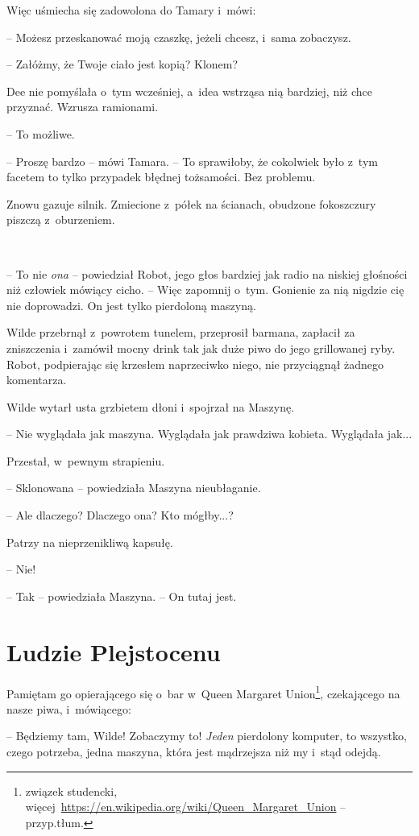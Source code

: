\documentclass[oneside,polish,11pt,sfheadings]{mwbk}
\begin{document}
Więc uśmiecha się zadowolona do Tamary i~mówi: 

-- Możesz przeskanować
moją czaszkę, jeżeli chcesz, i~sama zobaczysz.

-- Załóżmy, że Twoje ciało jest kopią? Klonem?

Dee nie pomyślała o~tym wcześniej, a~idea wstrząsa nią bardziej, niż
chce przyznać. Wzrusza ramionami. 

-- To możliwe.

-- Proszę bardzo -- mówi Tamara. -- To sprawiłoby, że cokolwiek było z~tym
facetem to tylko przypadek błędnej tożsamości. Bez problemu.

Znowu gazuje silnik. Zmiecione z~półek na ścianach, obudzone fokoszczury
piszczą z~oburzeniem.

~

-- To nie \emph{ona} -- powiedział Robot, jego głos bardziej jak radio na
niskiej głośności niż człowiek mówiący cicho. -- Więc zapomnij o~tym.
Gonienie za nią nigdzie cię nie doprowadzi. On jest tylko pierdoloną
maszyną.

Wilde przebrnął z~powrotem tunelem, przeprosił barmana, zapłacił za
zniszczenia i~zamówił mocny drink tak jak duże piwo do jego grillowanej
ryby. Robot, podpierając się krzesłem naprzeciwko niego, nie przyciągnął
żadnego komentarza.

Wilde wytarł usta grzbietem dłoni i~spojrzał na Maszynę.

-- Nie wyglądała jak maszyna. Wyglądała jak prawdziwa kobieta. Wyglądała
jak...

Przestał, w~pewnym strapieniu.

-- Sklonowana -- powiedziała Maszyna nieubłaganie.

-- Ale dlaczego? Dlaczego ona? Kto mógłby...?

Patrzy na nieprzenikliwą kapsułę. 

-- Nie!

-- Tak -- powiedziała Maszyna. -- On tutaj jest.


\chapter{Ludzie Plejstocenu}

Pamiętam go opierającego się o~bar w~Queen Margaret Union\footnote{związek
studencki,
więcej~\url{https://en.wikipedia.org/wiki/Queen\_Margaret\_Union} -- przyp.tłum.}, czekającego
na nasze piwa, i~mówiącego: 

-- Będziemy tam, Wilde! Zobaczymy to! \emph{Jeden} pierdolony komputer, to
wszystko, czego potrzeba, jedna maszyna, która jest mądrzejsza niż my i~stąd odejdą.
\end{document}
